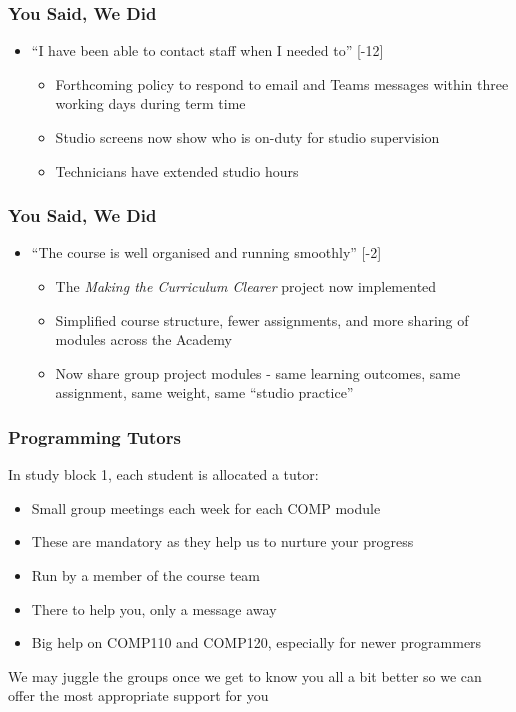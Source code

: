 \begin{frame}
	\frametitle{You Said, We Did}
			
	\begin{itemize}
		
		\item ``I have been able to contact staff when I needed to'' [-12]
		\begin{itemize}
			\item Forthcoming policy to respond to email and Teams messages within three working days during term time 
			\item Studio screens now show who is on-duty for studio supervision
			\item Technicians have extended studio hours
		\end{itemize}		
		
	\end{itemize}
\end{frame}

\begin{frame}
	\frametitle{You Said, We Did}
		
	\begin{itemize}
	
			\item ``The course is well organised and running smoothly'' [-2]
		\begin{itemize}
			\item The \textit{Making the Curriculum Clearer} project now implemented
			\item Simplified course structure, fewer assignments, and more sharing of modules across the Academy
			\item Now share group project modules - same learning outcomes, same assignment, same weight, same ``studio practice''
		\end{itemize}
		
	\end{itemize}
\end{frame}

\begin{frame}
	\frametitle{Programming Tutors}
	
	In study block 1, each student is allocated a tutor:
	
	\begin{itemize}
		\item Small group meetings each week for each COMP module
		\item These are mandatory as they help us to nurture your progress
		\item Run by a member of the course team
		\item There to help you, only a message away
		\item Big help on COMP110 and COMP120, especially for newer programmers
	\end{itemize}
	
	\vspace{1em}
	
	We may juggle the groups once we get to know you all a bit better so we can offer the most appropriate support for you
	
\end{frame}

